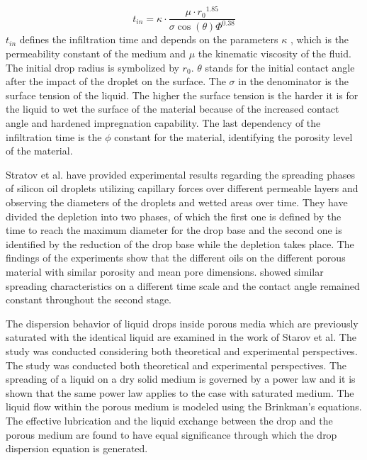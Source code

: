 \begin{equation}\label{eq:InfTime}
t_{in}=\kappa \cdotp {\frac{\mu \cdotp r{_0}^{1.85}}{\sigma \cos({\theta})\varPhi^{0.38}}}
\end{equation}
\newline
$t_{in}$ defines the infiltration time and depends on the parameters $\kappa$ , which is the permeability constant of the medium and $\mu$ the kinematic viscosity of the fluid. The initial drop radius is symbolized by $r_{0}$. $\theta$ stands for the initial contact angle after the impact of the droplet on the surface. The $\sigma$ in the denominator is the surface tension of the liquid. The higher the surface tension is the harder it is for the liquid to wet the surface of the material because of the increased contact angle and hardened impregnation capability. The last dependency of the infiltration time is  the $\phi$ constant for the material, identifying the porosity level of the material. \citep{markicevic2009infiltration}

Stratov et al. have provided experimental results regarding  the spreading phases of silicon oil droplets utilizing capillary forces over different permeable layers and observing the diameters of the droplets and wetted areas over time. They have divided the depletion into two phases, of which the first one is defined by the time to reach the maximum diameter for the drop base and the second one is identified by the reduction of the drop base while the depletion takes place. The findings of the experiments show that the different oils on the different porous material with similar porosity and mean pore dimensions. showed similar spreading characteristics on a different time scale and the contact angle remained constant throughout the second stage.\citep{starov2002thick}

The dispersion behavior of liquid drops inside porous media which are previously saturated with the identical liquid are examined in the work of Starov et al. The study was conducted considering both theoretical and experimental perspectives. The study was conducted both theoretical and experimental perspectives. The spreading of a liquid on a dry solid medium is governed by a power law and it is shown that the same power law applies to the case with saturated medium. The liquid flow within the porous medium is modeled using the Brinkman’s equations. The effective lubrication and the liquid exchange between the drop and the porous medium are found to have equal significance through which the drop dispersion equation is generated. \citep{starov2002saturated}
\newline

